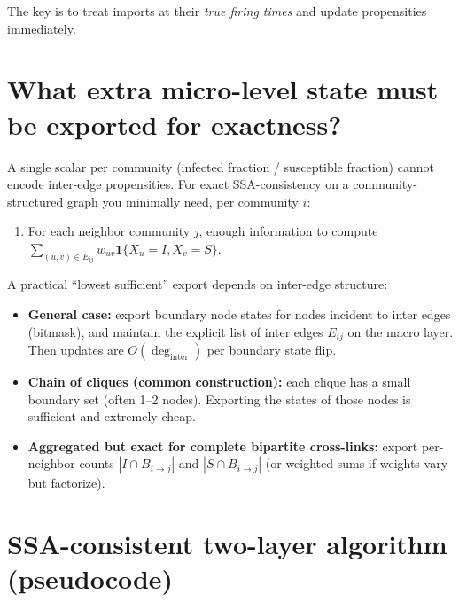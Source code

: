 \documentclass[11pt,a4paper]{article}
\begin{document}
The key is to treat imports at their \emph{true firing times} and update propensities immediately.

\section{What extra micro-level state must be exported for exactness?}

A single scalar per community (infected fraction / susceptible fraction) cannot encode inter-edge propensities.
For exact SSA-consistency on a community-structured graph you minimally need, per community $i$:

\begin{enumerate}[leftmargin=*]
\item For each neighbor community $j$, enough information to compute
$\sum_{(u,v)\in E_{ij}} w_{uv}\mathbf{1}\{X_u=I, X_v=S\}$.
\end{enumerate}

A practical ``lowest sufficient'' export depends on inter-edge structure:

\begin{itemize}[leftmargin=*]
\item \textbf{General case:} export boundary node states for nodes incident to inter edges (bitmask), and maintain
the explicit list of inter edges $E_{ij}$ on the macro layer. Then updates are $O(\deg_{\text{inter}})$ per boundary
state flip.
\item \textbf{Chain of cliques (common construction):} each clique has a small boundary set (often 1--2 nodes). Exporting
the states of those nodes is sufficient and extremely cheap.
\item \textbf{Aggregated but exact for complete bipartite cross-links:} export per-neighbor counts
$|I\cap B_{i\to j}|$ and $|S\cap B_{i\to j}|$ (or weighted sums if weights vary but factorize).
\end{itemize}

\section{SSA-consistent two-layer algorithm (pseudocode)}
\end{document}
